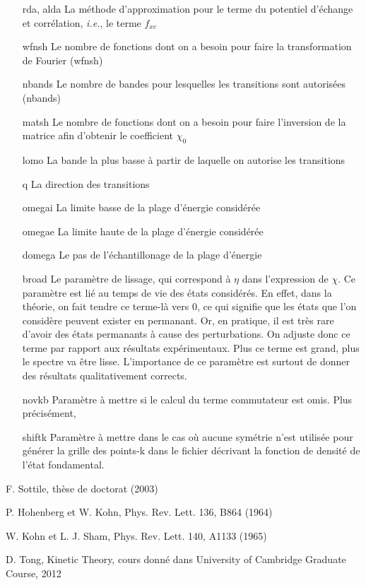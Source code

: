 \documentclass[12pt]{report}
\theoremstyle{theoreme}
\begin{document}
\begin{itemize}
\item[rda, alda] La méthode d'approximation pour le terme du potentiel d'échange et corrélation, \textit{i.e.}, le terme $f_{xc}$ %
\item[wfnsh] Le nombre de fonctions dont on a besoin pour faire la transformation de Fourier (wfnsh)%
\item[nbands] Le nombre de bandes pour lesquelles les transitions sont autorisées (nbands)
\item[matsh] Le nombre de fonctions dont on a besoin pour faire l'inversion de la matrice afin d'obtenir le coefficient $\chi_0$
\item[lomo] La bande la plus basse à partir de laquelle on autorise les transitions
\item[q] La direction des transitions
\item[omegai] La limite basse de la plage d'énergie considérée
\item[omegae] La limite haute de la plage d'énergie considérée
\item[domega] Le pas de l'échantillonage de la plage d'énergie
\item[broad] Le paramètre de lissage, qui correspond à $\eta$ dans l'expression de $\chi$. Ce paramètre est lié au temps de vie des états considérés. En effet, dans la théorie, on fait tendre ce terme-là vers 0, ce qui signifie que les états que l'on considère peuvent exister en permanant. Or, en pratique, il est très rare d'avoir des états permanants à cause des perturbations. On adjuste donc ce terme par rapport aux résultats expérimentaux. Plus ce terme est grand, plus le spectre va être lisse. L'importance de ce paramètre est surtout de donner des résultats qualitativement corrects.
\item[novkb] Paramètre à mettre si le calcul du terme commutateur est omis. Plus précisément, %
\item[shiftk] Paramètre à mettre dans le cas où aucune symétrie n'est utilisée pour générer la grille des points-k dans le fichier décrivant la fonction de densité de l'état fondamental.
\end{itemize}


\begin{thebibliography}{9}

	F. Sottile, thèse de doctorat (2003)

	P. Hohenberg et W. Kohn, Phys. Rev. Lett. 136, B864 (1964)

	W. Kohn et L. J. Sham, Phys. Rev. Lett. 140, A1133 (1965)
	
	D. Tong, Kinetic Theory, cours donné dans University of Cambridge Graduate Course, 2012

\end{thebibliography}
\end{document}
